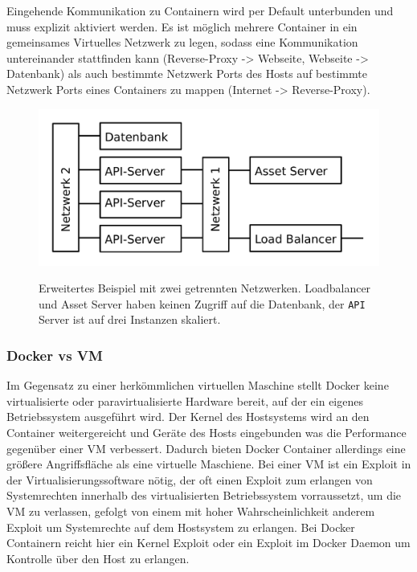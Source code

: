 Eingehende Kommunikation zu Containern wird per Default unterbunden und muss
explizit aktiviert werden. Es ist möglich mehrere Container in ein
gemeinsames Virtuelles Netzwerk zu legen, sodass eine Kommunikation
untereinander stattfinden kann (Reverse-Proxy -> Webseite, Webseite ->
Datenbank) als auch bestimmte Netzwerk Ports des Hosts auf bestimmte Netzwerk
Ports eines Containers zu mappen (Internet -> Reverse-Proxy).

\begin{figure}
  \includegraphics[width=\columnwidth]{images/docker-services-example.pdf}

  Erweitertes Beispiel mit zwei getrennten Netzwerken. Loadbalancer und Asset
  Server haben keinen Zugriff auf die Datenbank, der \texttt{API} Server ist auf
  drei Instanzen skaliert.
\end{figure}

\subsubsection{Docker vs VM}

Im Gegensatz zu einer herkömmlichen virtuellen Maschine stellt Docker keine
virtualisierte oder paravirtualisierte Hardware bereit, auf der ein eigenes
Betriebssystem ausgeführt wird. Der Kernel des Hostsystems wird an den Container
weitergereicht und Geräte des Hosts eingebunden was die Performance gegenüber
einer VM verbessert. Dadurch bieten Docker Container allerdings eine größere
Angriffsfläche als eine virtuelle Maschiene. Bei einer VM ist ein Exploit in der
Virtualisierungssoftware nötig, der oft einen Exploit zum erlangen von
Systemrechten innerhalb des virtualisierten Betriebssystem vorraussetzt, um die
VM zu verlassen, gefolgt von einem mit hoher Wahrscheinlichkeit anderem Exploit
um Systemrechte auf dem Hostsystem zu erlangen. Bei Docker Containern reicht
hier ein Kernel Exploit oder ein Exploit im Docker Daemon um Kontrolle über den
Host zu erlangen.

